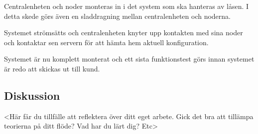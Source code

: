 \documentclass{article}
\begin{document}
Centralenheten och noder monteras in i det system som ska hanteras av låsen. I detta skede görs även en sladdragning mellan centralenheten och noderna.

Systemet strömsätts och centralenheten knyter upp kontakten med sina noder och  kontaktar sen servern för att hämta hem aktuell konfiguration.

Systemet är nu komplett monterat och ett sista funktionstest görs innan systemet är redo att skickas ut till kund. 

\subsection*{Diskussion}
<Här får du tillfälle att reflektera över ditt eget arbete. Gick det bra att tillämpa teorierna på ditt
flöde? Vad har du lärt dig? Etc>
\end{document}
